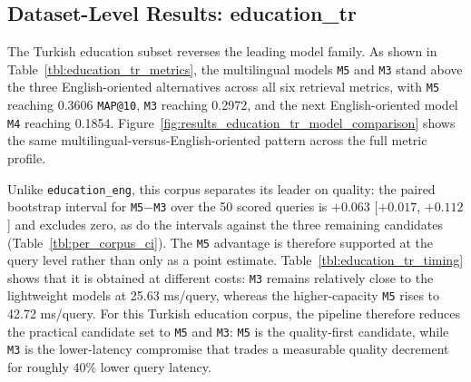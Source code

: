 \subsection{Dataset-Level Results: education\_tr}\label{results-education-tr}

The Turkish education subset reverses the leading model family. As shown in Table~\ref{tbl:education_tr_metrics}, the multilingual models \texttt{M5} and \texttt{M3} stand above the three English-oriented alternatives across all six retrieval metrics, with \texttt{M5} reaching 0.3606 \texttt{MAP@10}, \texttt{M3} reaching 0.2972, and the next English-oriented model \texttt{M4} reaching 0.1854. Figure~\ref{fig:results_education_tr_model_comparison} shows the same multilingual-versus-English-oriented pattern across the full metric profile.

Unlike \texttt{education\_eng}, this corpus separates its leader on quality: the paired bootstrap interval for \texttt{M5}$-$\texttt{M3} over the 50 scored queries is $+0.063$ [$+0.017$, $+0.112$] and excludes zero, as do the intervals against the three remaining candidates (Table~\ref{tbl:per_corpus_ci}). The \texttt{M5} advantage is therefore supported at the query level rather than only as a point estimate. Table~\ref{tbl:education_tr_timing} shows that it is obtained at different costs: \texttt{M3} remains relatively close to the lightweight models at 25.63 ms/query, whereas the higher-capacity \texttt{M5} rises to 42.72 ms/query. For this Turkish education corpus, the pipeline therefore reduces the practical candidate set to \texttt{M5} and \texttt{M3}: \texttt{M5} is the quality-first candidate, while \texttt{M3} is the lower-latency compromise that trades a measurable quality decrement for roughly 40\% lower query latency.

\begin{table}[htbp]
\caption{Retrieval metrics for the \texttt{education\_tr} dataset. Model IDs follow Table~\ref{tbl:experiment_embedding_models}; \texttt{M5} denotes multi-MPNet and \texttt{M3} denotes multi-MiniLM.}\label{tbl:education_tr_metrics}
\centering
\small

\end{table}

\begin{table}[htbp]
\caption{Compound single-machine timing summary for the \texttt{education\_tr} dataset.}\label{tbl:education_tr_timing}
\centering
\small

\end{table}

